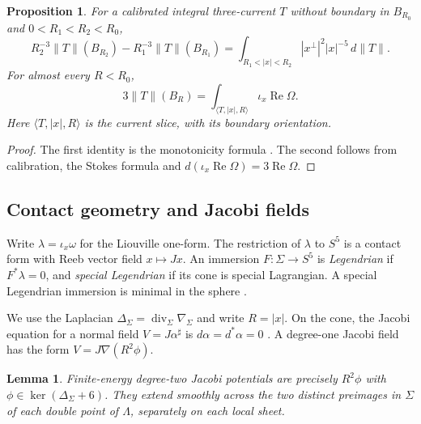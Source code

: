 \documentclass[11pt,a4paper]{article}
\numberwithin{equation}{section}
\newtheorem{proposition}[theorem]{Proposition}
\newtheorem{lemma}[theorem]{Lemma}
\theoremstyle{definition}
\theoremstyle{remark}
\newcommand{\Ree}{\operatorname{Re}}
\newcommand{\dd}{\,d}
\begin{document}
	\begin{proposition}\label{prop:monotonicity}
		For a calibrated integral three-current $T$ without boundary in $B_{R_0}$
		and $0<R_1<R_2<R_0$,
		\begin{equation}\label{eqn:monotonicity}
			R_2^{-3}\|T\|(B_{R_2})-R_1^{-3}\|T\|(B_{R_1})
			=\int_{R_1<|x|<R_2}|x^\perp|^2|x|^{-5}\dd\|T\|.
		\end{equation}
		For almost every $R<R_0$,
		\begin{equation}\label{eqn:stokes-boundary-integral}
			3\|T\|(B_R)=\int_{\langle T,|x|,R\rangle}
			\iota_x\Ree\Omega.
		\end{equation}
		Here $\langle T,|x|,R\rangle$ is the current slice, with its boundary
		orientation.
	\end{proposition}
	
	\begin{proof}
		The first identity is the monotonicity formula \cite{Allard}.
		The second follows from calibration, the Stokes formula and
		$d(\iota_x\Ree\Omega)=3\Ree\Omega$.
	\end{proof}
	
	\subsection{Contact geometry and Jacobi fields}
	\label{sect:contact-geometry-jacobi-fields}
	
	Write $\lambda=\iota_x\omega$ for the Liouville one-form.
	The restriction of $\lambda$ to $S^5$ is a contact form with Reeb
	vector field $x\mapsto Jx$.
	An immersion $F:\Sigma\to S^5$ is \emph{Legendrian} if $F^*\lambda=0$,
	and \emph{special Legendrian} if its cone is special Lagrangian.
	A special Legendrian immersion is minimal in the sphere
	\cite[Sections~2 and~3.4]{Joyce}.
	
	We use the Laplacian $\Delta_\Sigma=\operatorname{div}_\Sigma\nabla_\Sigma$
	and write $R=|x|$.
	On the cone, the Jacobi equation for a normal field $V=J\alpha^\sharp$ is
	$d\alpha=d^*\alpha=0$ \cite[Section~5.1]{Joyce}.
	A degree-one Jacobi field has the form $V=J\nabla(R^2\phi)$.
	
	\begin{lemma}\label{lem:jacobi}
		Finite-energy degree-two Jacobi potentials are precisely $R^2\phi$ with
		$\phi\in\ker(\Delta_\Sigma+6)$. They extend smoothly across the
		two distinct preimages in $\Sigma$ of each double point of $\Lambda$,
		separately on each local sheet.
	\end{lemma}
	
\end{document}
